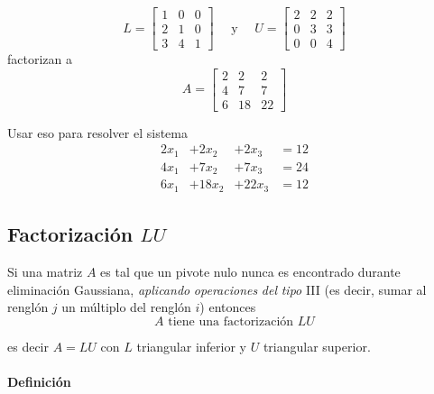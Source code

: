 \documentclass[
]{article}
\begin{document}
\begin{equation}
L =\begin{bmatrix} 1 &  0 & 0 \\
                   2 & 1 & 0 \\
                   3 & 4 & 1
                 \end{bmatrix}\quad \mbox{ y } \quad
U =\begin{bmatrix} 2 &  2 & 2 \\
                   0 & 3 & 3 \\
                   0 & 0 & 4
                 \end{bmatrix}
\end{equation} factorizan a \[
A =\begin{bmatrix} 2 &  2 & 2 \\
                   4 & 7 & 7 \\
                   6 & 18 & 22
                 \end{bmatrix}
\]

Usar eso para resolver el sistema \begin{equation*}
  \begin{matrix}
      2x_1 &+2 x_2 & +2 x_3  & = 12  \\
      4x_1  &  +7x_2 & +  7x_3  & =24   \\
      6x_1   & + 18x_2      &  +22 x_3  & =12
  \end{matrix}
\end{equation*}

\hypertarget{factorizaciuxf3n-lu}{%
\subsection{\texorpdfstring{Factorización
\(LU\)}{Factorización LU}}\label{factorizaciuxf3n-lu}}

Si una matriz \(A\) es tal que un pivote nulo nunca es encontrado
durante eliminación Gaussiana, \emph{aplicando} \emph{operaciones}
\emph{del} \emph{tipo} III (es decir, sumar al renglón \(j\) un múltiplo
del renglón \(i\)) entonces \[
A\mbox{ tiene una factorización }LU
\]

es decir \(A=LU\) con \(L\) triangular inferior y \(U\) triangular
superior.

\hypertarget{definiciuxf3n-6}{%
\paragraph{Definición}\label{definiciuxf3n-6}}
\end{document}

